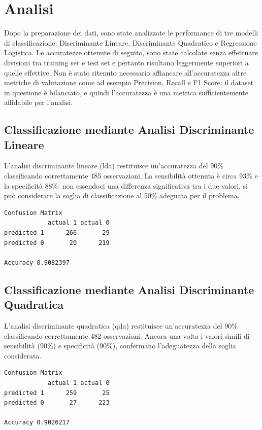 \documentclass[11pt,a4paper]{article}
\begin{document}
\newpage
\section{Analisi}
Dopo la preparazione dei dati, sono state analizzate le performance di tre modelli di classificazione: Discriminante Lineare, Discriminante Quadratico e Regressione Logistica.
Le accuratezze ottenute di seguito, sono state calcolate senza effettuare divisioni tra training set e test set e pertanto risultano leggermente superiori a quelle effettive.
Non è stato ritenuto necessario affiancare all'accuratezza altre metriche di valutazione come ad esempio Precision, Recall e F1 Score: il dataset in questione è bilanciato, e quindi l'accuratezza è una metrica sufficientemente affidabile per l'analisi.

\subsection{Classificazione mediante Analisi Discriminante Lineare}
L'analisi discriminante lineare (lda) restituisce un'accuratezza del 90\% classificando correttamente 485 osservazioni. La sensibilità ottenuta è circa 93\% e la specificità 88\%: non essendoci una differenza significativa tra i due valori, si può considerare la soglia di classificazione al 50\% adeguata per il problema.

\begin{lstlisting}[language=bash,basicstyle=\tiny,tabsize=2,frame = single]
Confusion Matrix
            actual 1 actual 0
predicted 1      266       29
predicted 0       20      219

Accuracy 0.9082397
\end{lstlisting}

\subsection{Classificazione mediante Analisi Discriminante Quadratica}
L'analisi discriminante quadratica (qda) restituisce un'accuratezza del 90\% classificando correttamente 482 osservazioni. Ancora una volta i valori simili di sensibilità (90\%) e specificità (90\%), confermano l'adeguatezza della soglia considerata.

\begin{lstlisting}[language=bash,basicstyle=\tiny,tabsize=2,frame = single]
Confusion Matrix
            actual 1 actual 0
predicted 1      259       25
predicted 0       27      223

Accuracy 0.9026217
\end{lstlisting}
\end{document}

